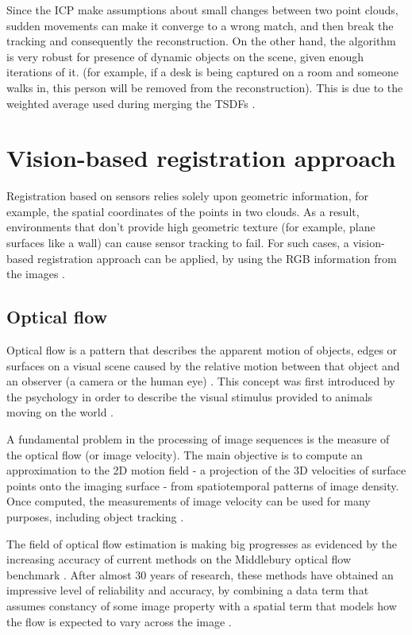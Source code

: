 \documentclass[msc, a4paper, classic, en]{ufbathesis}
\begin{document}
Since the ICP make assumptions about small changes between two point clouds, sudden movements can make it converge to a wrong match, and then break the tracking and consequently the reconstruction. On the other hand, the algorithm is very robust for presence of dynamic objects on the scene, given enough iterations of it. (for example, if a desk is being captured on a room and someone walks in, this person will be removed from the reconstruction). This is due to the weighted average used during merging the TSDFs \cite{michele}.

\section{Vision-based registration approach}

Registration based on sensors relies solely upon geometric information, for example, the spatial coordinates of the points in two clouds. As a result, environments that don't provide high geometric texture (for example, plane surfaces like a wall) can cause sensor tracking to fail. For such cases, a vision-based registration approach can be applied, by using the RGB information from the images \cite{kinectkanade}. 
\subsection{Optical flow}

Optical flow is a pattern that describes the apparent motion of objects, edges or surfaces on a visual scene caused by the relative motion between that object and an observer (a camera or the human eye) \cite{burton1978thinking}. This concept was first introduced by the psychology in order to describe the visual stimulus provided to animals moving on the world \cite{gibson1950perception}.

A fundamental problem in the processing of image sequences is the measure of the optical flow (or image velocity). The main objective is to compute an approximation to the 2D motion field - a projection of the 3D velocities of surface points onto the imaging surface - from spatiotemporal patterns of image density. Once computed, the measurements of image velocity can be used for many purposes, including object tracking \cite{opticalflow}.

The field of optical flow estimation is making big progresses as evidenced by the increasing accuracy of current methods on the Middlebury optical flow benchmark \cite{Scharstein:2002:TED:598429.598475}. After almost 30 years of research, these methods have obtained an impressive level of reliability and accuracy, by combining a data term that assumes constancy of some image property with a spatial term that models how the flow is expected to vary across the image \cite{opticalflow14}.
\end{document}
